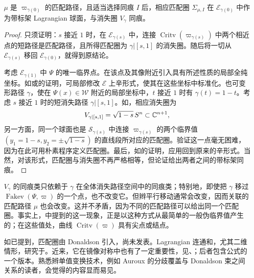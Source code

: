\begin{lemma}\label{st:16.15}
$\mu$ 是 $\varpi_{\gamma(0)}$ 的匹配路径，且适当选择同痕 $I$ 后，相应匹配圈 $\Sigma_{\mu,I}$ 在 $\mathcal E_{\gamma(0)}$ 中作为带标架 Lagrangian 球面，与消失圈 $V_\gamma$ 同痕。
\end{lemma}
\begin{proof}
只须证明：$s$ 接近 $1$ 时，在 $\mathcal E_{\gamma(s)}$ 中，连接 $\operatorname{Critv}(\varpi_{\gamma(s)})$ 中两个相近点的短路径是匹配路径，且所得匹配圈为 $\gamma|[s,1]$ 的消失圈。随后将一切从 $\mathcal E_{\gamma(s)}$ 移回 $\mathcal E_{\gamma(0)}$，就得到原结论。

考虑 $\mathcal E_{\gamma(1)}$ 中 $\Psi$ 的唯一临界点。在该点及其像附近引入具有所述性质的局部全纯坐标。如或的证明，可局部修改 $\mathcal E$ 上辛形式，使其在这些坐标中标准化。也可变形路径 $\gamma$，使在 $\Psi(x)\in\mathcal W$ 附近的局部坐标中，$t$ 接近 $1$ 时有 $\gamma(t)=1-t$。考虑 $s$ 接近 $1$ 时的短消失路径 $\gamma|[s,1]$。如，相应消失圈为
\[
V_{\gamma|[s,1]}=\sqrt{1-s}\,S^n\subset\mathbb C^{n+1},
\]
另一方面，同一个球面也是 $\mathcal S_{\gamma(s)}$ 中连接 $\varpi_{\gamma(s)}$ 的两个临界值 $(y_1=1-s,y_2=\pm\sqrt{1-s})$ 的直线段所对应的匹配圈。验证这一点毫无困难，因为在此可用朴素程序定义匹配圈。最后，如的证明，应用回到原来的辛形式。当然，对该形式，匹配圈与消失圈不再严格相等，但论证给出两者之间的带标架同痕。
\end{proof}

\begin{note}\label{st:16.16}
$V_\gamma$ 的同痕类只依赖于 $\gamma$ 在全体消失路径空间中的同痕类；特别地，即使把 $\gamma$ 移过 $\operatorname{Fakev}(\Psi,\varpi)$ 的一个点，也不改变它。但辫平行移动通常会改变，因而关联的匹配路径 $\mu$ 也会改变。这并不矛盾，因为不同的匹配路径可以给出同一个匹配圈。事实上，中提到的这一现象，正是以这种方式从最简单的一般伪临界值产生的；在这些值处，曲线 $\operatorname{Critv}(\varpi)$ 具有尖点或结点。
\end{note}

\begin{note}\label{st:16.17}
如已提到，匹配圈由 Donaldson 引入，尚未发表。Lagrangian 连通和，尤其二维情形，研究于。近来，它在镜像对称中也有了一定重要性，见、；后者包含公式的一个版本。熟悉辫单值变换技术，例如 Auroux 的分歧覆盖与 Donaldson 束之间关系的读者，会觉得的内容显而易见。
\end{note}
